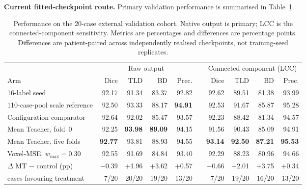 \ifshowcurrentcontrol
\begin{currentcontrolroute}
\noindent\textbf{Current fitted-checkpoint route.}
Primary validation performance is summarised in Table~\ref{tab:primary-current}.

\begin{table}[htbp]
  \centering
  \footnotesize
  \setlength{\tabcolsep}{4.5pt}
  \caption[Current fitted-checkpoint comparison on external validation]{Performance on the
  20-case external validation cohort. Native output is primary; LCC is the connected-component
  sensitivity. Metrics are percentages and differences are percentage points. Differences are
  patient-paired across independently realised checkpoints, not training-seed replicates.}
  \label{tab:primary-current}
  \begin{tabular}{lrrrrcrrrr}
    \toprule
    & \multicolumn{4}{c}{Raw output} & & \multicolumn{4}{c}{Connected component (LCC)} \\
    \cmidrule(lr){2-5} \cmidrule(lr){7-10}
    Arm & Dice & TLD & BD & Prec. & & Dice & TLD & BD & Prec. \\
    \midrule
    16-label seed                  & 92.17 & 91.34 & 83.37 & 92.82 & & 92.62 & 89.51 & 81.38 & 93.99 \\
    110-case-pool scale reference & 92.50 & 93.33 & 88.17 & \textbf{94.91} & & 92.53 & 91.67 & 85.87 & 95.28 \\
    \addlinespace
    Configuration comparator       & 92.64 & 92.02 & 85.47 & 93.57 & & 92.23 & 88.42 & 81.34 & 94.57 \\
    Mean Teacher, fold~0           & 92.25 & \textbf{93.98} & \textbf{89.09} & 94.15 & & 91.56 & 90.43 & 85.09 & 94.91 \\
    Mean Teacher, five folds       & \textbf{92.77} & 93.81 & 88.93 & 94.55 & & \textbf{93.14} & \textbf{92.50} & \textbf{87.21} & \textbf{95.53} \\
    \addlinespace
    Voxel-MSE, $w_{\max}=0.30$     & 92.55 & 91.69 & 84.84 & 93.40 & & 92.29 & 88.23 & 80.96 & 94.66 \\
    \addlinespace
    $\Delta$ MT $-$ control (pp)   & $-$0.39 & $+$1.96 & $+$3.62 & $+$0.57 & & $-$0.66 & $+$2.01 & $+$3.75 & $+$0.34 \\
    \quad cases favouring treatment & 7/20 & 20/20 & 19/20 & 13/20 & & 7/20 & 19/20 & 16/20 & 13/20 \\
    \bottomrule
  \end{tabular}
\end{table}
\end{currentcontrolroute}
\fi

